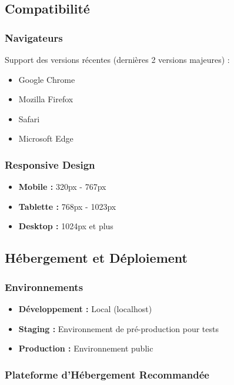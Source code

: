 \documentclass[12pt,a4paper]{article}
\begin{document}
\subsection{Compatibilité}

\subsubsection{Navigateurs}

Support des versions récentes (dernières 2 versions majeures) :
\begin{itemize}[leftmargin=*]
    \item Google Chrome
    \item Mozilla Firefox
    \item Safari
    \item Microsoft Edge
\end{itemize}

\subsubsection{Responsive Design}

\begin{itemize}[leftmargin=*]
    \item \textbf{Mobile :} 320px - 767px
    \item \textbf{Tablette :} 768px - 1023px
    \item \textbf{Desktop :} 1024px et plus
\end{itemize}

\subsection{Hébergement et Déploiement}

\subsubsection{Environnements}

\begin{itemize}[leftmargin=*]
    \item \textbf{Développement :} Local (localhost)
    \item \textbf{Staging :} Environnement de pré-production pour tests
    \item \textbf{Production :} Environnement public
\end{itemize}

\subsubsection{Plateforme d'Hébergement Recommandée}
\end{document}
